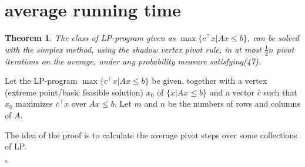 \documentclass{article}
\newcounter{lecnum}
\newtheorem{theorem}{Theorem}[lecnum]
\newenvironment{proof}{{\it Proof.}}{ \hfill $\square$}
\begin{document}
\section{average running time}
\begin{theorem}
The class of LP-program given as $\max\{c^\top x|Ax\leqslant b\}$, can be solved with the simplex method, using the shadow vertex pivot rule, in at most $\frac{1}{2}n$ pivot iterations on the average, under any probability measure satisfying(47).
\end{theorem}
\begin{proof}
Let the LP-program $\max\{c^\top x| Ax\leqslant b\}$ be given, together with a vertex (extreme point/basic feasible solution) $x_0$ of $\{x| Ax\leqslant b\}$ and a vector $\bar{c}$ such that $x_0$ maximizes $\bar{c}^\top x$ over $Ax\leqslant b$. Let $m$ and $n$ be the numbers of rows and columns of $A$.  

The idea of the proof is to calculate the average pivot steps over some collections of LP.


\end{proof}
\end{document}
